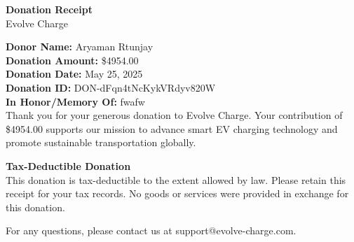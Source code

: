 \documentclass[a4paper,12pt]{article}
\begin{document}
\begin{center}
{\Large \textbf{Donation Receipt}}\\
\vspace{0.5cm}
Evolve Charge
\end{center}

\vspace{0.5cm}

\noindent
{\bf Donor Name:} Aryaman Rtunjay\\
{\bf Donation Amount:} \$4954.00\\
{\bf Donation Date:} May 25, 2025\\
{\bf Donation ID:} DON-dFqn4tNcKykVRdyv820W\\
\noindent
{\bf In Honor/Memory Of:} fwafw\\

\vspace{0.5cm}
\noindent
Thank you for your generous donation to Evolve Charge. Your contribution of \$4954.00 supports our mission to advance smart EV charging technology and promote sustainable transportation globally.

\vspace{0.5cm}

\noindent
{\bf Tax-Deductible Donation}\\
This donation is tax-deductible to the extent allowed by law. Please retain this receipt for your tax records. No goods or services were provided in exchange for this donation.

\vspace{0.5cm}

\noindent
For any questions, please contact us at support@evolve-charge.com.
\end{document}
